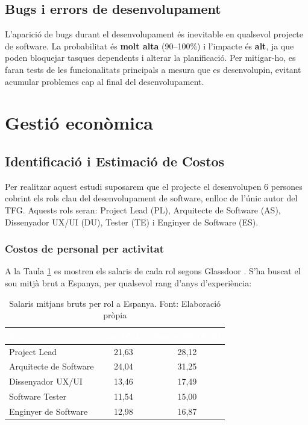 \documentclass[11pt,a4paper]{report}
\begin{document}
\subsection{Bugs i errors de desenvolupament}
L'aparició de bugs durant el desenvolupament és inevitable en qualsevol projecte de software. La probabilitat és \textbf{molt alta} (90--100\%) i l'impacte és \textbf{alt}, ja que poden bloquejar tasques dependents i alterar la planificació. Per mitigar-ho, es faran tests de les funcionalitats principals a mesura que es desenvolupin, evitant acumular problemes cap al final del desenvolupament.

\section{Gestió econòmica}
\label{sec:gestio_economica}
\subsection{Identificació i Estimació de Costos}

Per realitzar aquest estudi suposarem que el projecte el desenvolupen 6 persones cobrint els rols clau del desenvolupament de software, enlloc de l'únic autor del TFG. Aquests rols seran: Project Lead (PL), Arquitecte de Software (AS), Dissenyador UX/UI (DU), Tester (TE) i Enginyer de Software (ES).

\subsubsection{Costos de personal per activitat}

A la Taula \ref{tab:salaris} es mostren els salaris de cada rol segons Glassdoor \cite{glassdoor_salaris_nodate}. S'ha buscat el sou mitjà brut a Espanya, per qualsevol rang d'anys d'experiència:

\begin{table}[H]
    \centering
    \small
    \renewcommand{\arraystretch}{2}
    \begin{tabular}{|l|c|c|}
        \hline
        \rowcolor{oceanblue}\textcolor{white}{\textbf{Rol}} & \textcolor{white}{\textbf{Sou (€/h)}} & \textcolor{white}{\textbf{Sou + SS (€/h)}} \\
        \hline
        Project Lead            & 21,63 & 28,12 \\
        \hline
        Arquitecte de Software  & 24,04 & 31,25 \\
        \hline
        Dissenyador UX/UI       & 13,46 & 17,49 \\
        \hline
        Software Tester         & 11,54 & 15,00 \\
        \hline
        Enginyer de Software    & 12,98 & 16,87 \\
        \hline
    \end{tabular}
    \caption[Salaris per rol]{Salaris mitjans bruts per rol a Espanya. Font: Elaboració pròpia}
    \label{tab:salaris}
\end{table}
\end{document}
